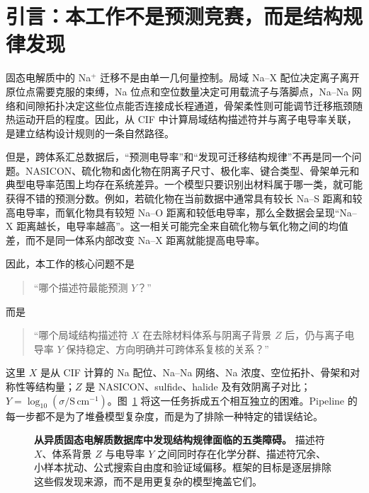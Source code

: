 \section{引言：本工作不是预测竞赛，而是结构规律发现}

固态电解质中的 Na$^+$ 迁移不是由单一几何量控制。局域 Na--X 配位决定离子离开原位点需要克服的束缚，Na 位点和空位数量决定可用载流子与落脚点，Na--Na 网络和间隙拓扑决定这些位点能否连接成长程通道，骨架柔性则可能调节迁移瓶颈随热运动开启的程度。因此，从 CIF 中计算局域结构描述符并与离子电导率关联，是建立结构设计规则的一条自然路径\cite{Adams2006,Sendek2017}。

但是，跨体系汇总数据后，“预测电导率”和“发现可迁移结构规律”不再是同一个问题。NASICON、硫化物和卤化物在阴离子尺寸、极化率、键合类型、骨架单元和典型电导率范围上均存在系统差异。一个模型只要识别出材料属于哪一类，就可能获得不错的预测分数。例如，若硫化物在当前数据中通常具有较长 Na--S 距离和较高电导率，而氧化物具有较短 Na--O 距离和较低电导率，那么全数据会呈现“Na--X 距离越长，电导率越高”。这一相关可能完全来自硫化物与氧化物之间的均值差，而不是同一体系内部改变 Na--X 距离就能提高电导率。

因此，本工作的核心问题不是

\begin{quote}
“哪个描述符最能预测 $Y$？”
\end{quote}

而是

\begin{quote}
“哪个局域结构描述符 $X$ 在去除材料体系与阴离子背景 $Z$ 后，仍与离子电导率 $Y$ 保持稳定、方向明确并可跨体系复核的关系？”
\end{quote}

这里 $X$ 是从 CIF 计算的 Na 配位、Na--Na 网络、Na 浓度、空位拓扑、骨架和对称性等结构量；$Z$ 是 NASICON、sulfide、halide 及有效阴离子对比；$Y=\log_{10}(\sigma/\mathrm{S\,cm^{-1}})$。图~\ref{fig:problem} 将这一任务拆成五个相互独立的困难。Pipeline 的每一步都不是为了堆叠模型复杂度，而是为了排除一种特定的错误结论。

\begin{figure}[htbp]
\centering
\resizebox{\textwidth}{!}{}
\caption{\textbf{从异质固态电解质数据库中发现结构规律面临的五类障碍。} 描述符 $X$、体系背景 $Z$ 与电导率 $Y$ 之间同时存在化学分群、描述符冗余、小样本扰动、公式搜索自由度和验证域偏移。框架的目标是逐层排除这些假发现来源，而不是用更复杂的模型掩盖它们。}
\label{fig:problem}
\end{figure}


